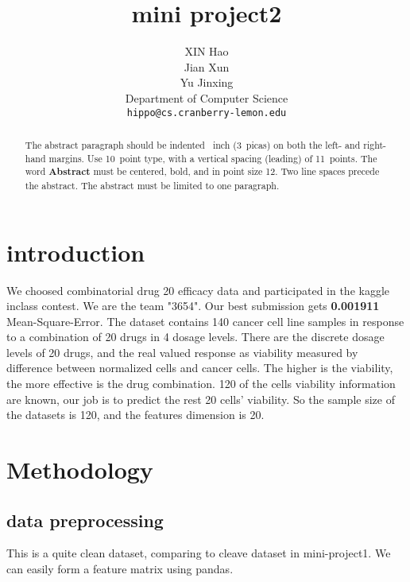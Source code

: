 \documentclass{article}
\title{mini project2}
\author{
  XIN Hao \\
  Jian Xun \\
  Yu Jinxing \\
  Department of Computer Science\\
  \texttt{hippo@cs.cranberry-lemon.edu} \\
}
\begin{document}

\maketitle

\begin{abstract}
  The abstract paragraph should be indented ~inch
  (3~picas) on both the left- and right-hand margins. Use 10~point
  type, with a vertical spacing (leading) of 11~points.  The word
  \textbf{Abstract} must be centered, bold, and in point size 12. Two
  line spaces precede the abstract. The abstract must be limited to
  one paragraph.
\end{abstract}

\section{introduction}
We choosed combinatorial drug 20 efficacy data and participated in the kaggle inclass contest.  We are the team "3654". Our best submission gets \textbf{0.001911} Mean-Square-Error. 
The dataset contains 140 cancer cell line samples in response to a combination of 20 drugs in 4 dosage levels. There are the discrete dosage levels of 20 drugs, and the real valued response as viability measured by difference between normalized cells and cancer cells. The higher is the viability, the more effective is the drug combination. 120 of the cells viability information are known, our job is to predict the rest 20 cells' viability.
So the sample size of the datasets is 120, and the features dimension is 20. 

\section{Methodology}

\subsection{data preprocessing}
This is a quite clean dataset, comparing to cleave dataset in mini-project1. We can easily form a feature matrix using pandas.\\
\end{document}
